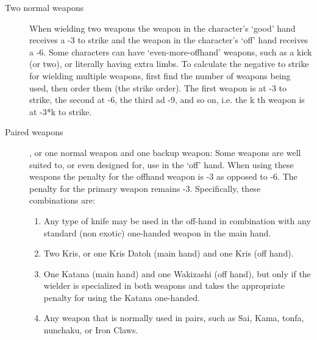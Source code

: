 \documentclass[twoside]{book}
\begin{document}
\begin{description}
    
  \item[ Two normal weapons ]   When wielding two weapons the weapon in the
                  character's `good' hand receives a -3
                  to strike and the weapon in the character's
                  `off' hand receives a -6. Some characters
                  can have `even-more-offhand' weapons, such
                  as a kick (or two), or literally having extra limbs. To
                  calculate the negative to strike for wielding multiple
                  weapons, first find the number of weapons being used,
                  then order them (the strike order). The first weapon is
                  at -3 to strike, the second at -6, the third ad -9, and
                  so on, i.e. the k
                   th   weapon is at -3*k to strike. 
                
  \item[ Paired weapons ]  , or one normal weapon and one backup weapon:
                  Some weapons are well suited to, or even designed for,
                  use in the `off' hand. When using these
                  weapons the penalty for the offhand weapon is -3 as
                  opposed to -6. The penalty for the primary weapon
                  remains -3. Specifically, these combinations are:
                  
\begin{enumerate}
      
  \item 
                         Any type of knife may be used in the
                         off-hand in combination with any standard (non
                         exotic) one-handed weapon in the main hand.
                         
                    
  \item 
                       Two Kris, or one Kris Datoh (main hand) and
                       one Kris (off hand). 
                    
  \item 
                       One Katana (main hand) and one Wakizashi
                       (off hand), but only if the wielder is specialized
                       in both weapons and takes the appropriate penalty
                       for using the Katana one-handed. 
                    
  \item 
                       Any weapon that is normally used in pairs,
                       such as Sai, Kama, tonfa, nunchaku, or Iron Claws.
                       

\end{enumerate}
\end{description}
\end{document}
